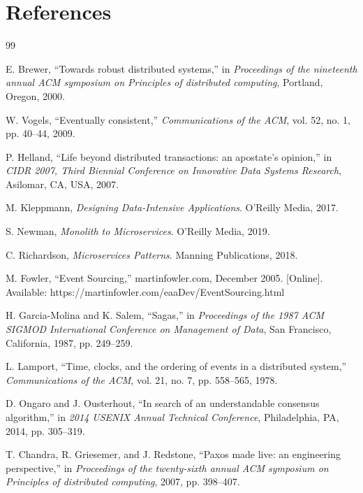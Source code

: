 \section{References}

\begin{thebibliography}{99}

E. Brewer, ``Towards robust distributed systems,'' in \textit{Proceedings of the nineteenth annual ACM symposium on Principles of distributed computing}, Portland, Oregon, 2000.

W. Vogels, ``Eventually consistent,'' \textit{Communications of the ACM}, vol. 52, no. 1, pp. 40--44, 2009.

P. Helland, ``Life beyond distributed transactions: an apostate's opinion,'' in \textit{CIDR 2007, Third Biennial Conference on Innovative Data Systems Research}, Asilomar, CA, USA, 2007.

M. Kleppmann, \textit{Designing Data-Intensive Applications}. O'Reilly Media, 2017.

S. Newman, \textit{Monolith to Microservices}. O'Reilly Media, 2019.

C. Richardson, \textit{Microservices Patterns}. Manning Publications, 2018.

M. Fowler, ``Event Sourcing,'' martinfowler.com, December 2005. [Online]. Available: https://martinfowler.com/eaaDev/EventSourcing.html

H. Garcia-Molina and K. Salem, ``Sagas,'' in \textit{Proceedings of the 1987 ACM SIGMOD International Conference on Management of Data}, San Francisco, California, 1987, pp. 249--259.

L. Lamport, ``Time, clocks, and the ordering of events in a distributed system,'' \textit{Communications of the ACM}, vol. 21, no. 7, pp. 558--565, 1978.

D. Ongaro and J. Ousterhout, ``In search of an understandable consensus algorithm,'' in \textit{2014 USENIX Annual Technical Conference}, Philadelphia, PA, 2014, pp. 305--319.

T. Chandra, R. Griesemer, and J. Redstone, ``Paxos made live: an engineering perspective,'' in \textit{Proceedings of the twenty-sixth annual ACM symposium on Principles of distributed computing}, 2007, pp. 398--407.


\end{thebibliography}
